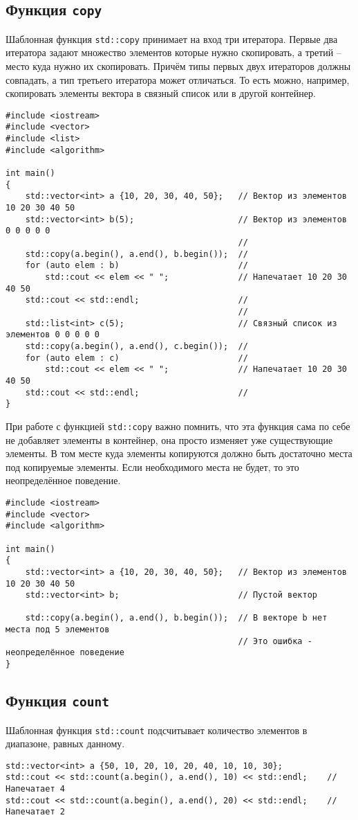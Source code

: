 \documentclass{article}
\begin{document}
\subsection*{Функция \texttt{copy}}
Шаблонная функция \texttt{std::copy} принимает на вход три итератора. Первые два итератора задают множество элементов которые нужно скопировать, а третий -- место куда нужно их скопировать. Причём типы первых двух итераторов должны совпадать, а тип третьего итератора может отличаться. То есть можно, например, скопировать элементы вектора в связный список или в другой контейнер. 
\begin{lstlisting}
#include <iostream>
#include <vector>
#include <list>
#include <algorithm>

int main()
{
	std::vector<int> a {10, 20, 30, 40, 50};   // Вектор из элементов  10 20 30 40 50
	std::vector<int> b(5);                     // Вектор из элементов  0 0 0 0 0
 											   //
	std::copy(a.begin(), a.end(), b.begin());  //
	for (auto elem : b)                        //
		std::cout << elem << " ";              // Напечатает 10 20 30 40 50
	std::cout << std::endl;                    //
	                                           //
	std::list<int> c(5);                       // Связный список из элементов 0 0 0 0 0
	std::copy(a.begin(), a.end(), c.begin());  //
	for (auto elem : c)                        //
		std::cout << elem << " ";              // Напечатает 10 20 30 40 50
	std::cout << std::endl;                    //
}
\end{lstlisting}
При работе с функцией \texttt{std::copy} важно помнить, что эта функция сама по себе не добавляет элементы в контейнер, она просто изменяет уже существующие элементы. В том месте куда элементы копируются должно быть достаточно места под копируемые элементы. Если необходимого места не будет, то это неопределённое поведение.
\begin{lstlisting}
#include <iostream>
#include <vector>
#include <algorithm>

int main()
{
	std::vector<int> a {10, 20, 30, 40, 50};   // Вектор из элементов  10 20 30 40 50
	std::vector<int> b;                        // Пустой вектор
	
	std::copy(a.begin(), a.end(), b.begin());  // В векторе b нет места под 5 элементов
	                                           // Это ошибка - неопределённое поведение
}
\end{lstlisting}


\subsection*{Функция \texttt{count}}
Шаблонная функция \texttt{std::count} подсчитывает количество элементов в диапазоне, равных данному.
\begin{lstlisting}
std::vector<int> a {50, 10, 20, 10, 20, 40, 10, 10, 30};
std::cout << std::count(a.begin(), a.end(), 10) << std::endl;    // Напечатает 4
std::cout << std::count(a.begin(), a.end(), 20) << std::endl;    // Напечатает 2
\end{lstlisting}
\end{document}
